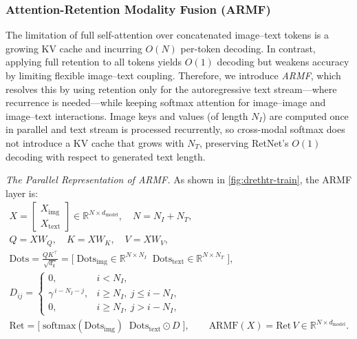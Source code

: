 \documentclass[times, review, 10pt]{elsarticle}
\begin{document}
\subsubsection{Attention-Retention Modality Fusion (ARMF)}
\label{sec:armf}
The limitation of full self-attention over concatenated image–text tokens is a growing KV cache and incurring \(O(N)\) per-token decoding. In contrast, applying full retention to all tokens yields \(O(1)\) decoding but weakens accuracy by limiting flexible image–text coupling. Therefore, we introduce \emph{ARMF}, which resolves this by using retention only for the autoregressive text stream—where recurrence is needed—while keeping softmax attention for image–image and image–text interactions. Image keys and values (of length $N_I$) are computed once in parallel and text stream is processed recurrently, so cross-modal softmax does not introduce a KV cache that grows with $N_T$, preserving RetNet’s \(O(1)\) decoding with respect to generated text length.
\par\smallskip

\noindent\textit{The Parallel Representation of ARMF.} As shown in \cref{fig:drethtr-train}, the ARMF layer is:
\begin{equation}
\begin{gathered}
X=\begin{bmatrix}X_{\text{img}}\\ X_{\text{text}}\end{bmatrix}\in\mathbb{R}^{N\times d_{\text{model}}},\quad N=N_I+N_T,\\
Q=XW_Q,\quad K=XW_K,\quad V=XW_V,\\
\text{Dots}=\frac{QK^\top}{\sqrt{d_k}}
=\Big[\;\text{Dots}_{\text{img}}\in\mathbb{R}^{N\times N_I}\;\; \text{Dots}_{\text{text}}\in\mathbb{R}^{N\times N_T}\;\Big],\\
D_{ij}=
\begin{cases}
0, & i< N_I,\\
\gamma^{\,i-N_I - j}, & i\ge N_I,\ j\le i-N_I,\\
0, & i\ge N_I,\ j> i-N_I,
\end{cases}\\
\text{Ret}=\Big[\;\text{softmax}(\text{Dots}_{\text{img}})\;\; \text{Dots}_{\text{text}}\odot D\;\Big],\qquad
\text{ARMF}(X)=\text{Ret}\,V\in\mathbb{R}^{N\times d_{\text{model}}}.
\end{gathered}
\end{equation}
\end{document}
